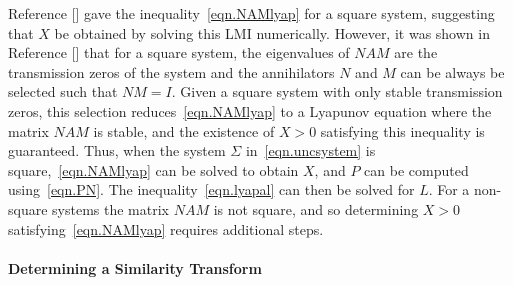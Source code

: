 \documentclass[]{../sty/aiaa-tc}
\begin{document}
  Reference [] gave the inequality\ \eqref{eqn.NAMlyap} for a square system, suggesting that $X$ be obtained by solving this LMI numerically.
  However, it was shown in Reference [] that for a square system, the eigenvalues of $NAM$ are the transmission zeros of the system and the annihilators $N$ and $M$ can be always be selected such that $NM=I$.
  Given a square system with only stable transmission zeros, this selection reduces\ \eqref{eqn.NAMlyap} to a Lyapunov equation where the matrix $NAM$ is stable, and the existence of $X>0$ satisfying this inequality is guaranteed.\cite{barkana.comments.2004} Thus, when the system $\Sigma$ in\ \eqref{eqn.uncsystem} is square,\ \eqref{eqn.NAMlyap} can be solved to obtain $X$, and $P$ can be computed using\ \eqref{eqn.PN}.
  The inequality\ \eqref{eqn.lyapal} can then be solved for $L$.
  For a non-square systems the matrix $NAM$ is not square, and so determining $X>0$ satisfying\ \eqref{eqn.NAMlyap} requires additional steps.

  \paragraph{Determining a Similarity Transform}
\end{document}
